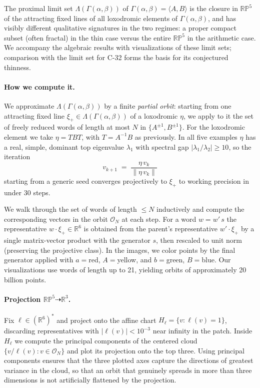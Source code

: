 \documentclass[11pt]{article}
\newcommand{\Gammaab}{\Gamma(\alpha,\beta)}
\begin{document}
The proximal limit set $\Lambda(\Gammaab)$ of $\Gammaab = \langle A, B \rangle$
is the closure in $\mathbb{RP}^5$ of the attracting fixed lines of all
loxodromic elements of $\Gammaab$, and has visibly different qualitative
signatures in the two regimes: a proper compact subset (often fractal) in
the thin case versus the entire $\mathbb{RP}^5$ in the arithmetic case.  We
accompany the algebraic results with visualizations of these limit sets;
comparison with the limit set for C-32 forms the basis for its conjectured
thinness.  






\paragraph{How we compute it.}

We approximate $\Lambda(\Gammaab)$ by a finite \emph{partial
orbit}: starting from one attracting fixed line $\xi_+ \in \Lambda(\Gammaab)$ of a loxodromic $\eta$, we
apply to it the set of freely reduced words of length at most $N$ in
$\{A^{\pm 1}, B^{\pm 1}\}$.  
For the loxodromic element we take $\eta = TBT$, with $T = A^{-1}B$ as previously.  In all five examples $\eta$ has a real, simple,
dominant top eigenvalue $\lambda_1$ with spectral gap $|\lambda_1/\lambda_2| \geq 10$,
so the iteration
\[
  v_{k+1} \;=\; \frac{\eta\, v_k}{\|\eta\, v_k\|}
\]
starting from a generic seed converges projectively to $\xi_+$ to working
precision in under $30$ steps.

We walk through the set of words of length $\leq N$ inductively and compute
the corresponding vectors in the orbit $\mathcal{O}_N$ at each step. For a word
$w = w'\, s$ the representative $w \cdot \xi_+ \in \mathbb{R}^6$ is
obtained from the parent's representative $w' \cdot \xi_+$ by a single
matrix-vector product with the generator $s$, then rescaled to unit norm
(preserving the projective class). 
In the images, we color points by the final generator applied with $a=$red, $A=$yellow, and $b=$green, $B=$blue.
Our visualizations use words of length up to 21, yielding orbits of approximately 20 billion points.  



\paragraph{Projection $\mathbb{RP}^5 \dashrightarrow \mathbb{R}^3$.}
Fix $\ell \in (\mathbb{R}^6)^*$ and project onto the affine chart
$H_\ell = \{v : \ell(v) = 1\}$, discarding representatives with
$|\ell(v)| < 10^{-3}$ near infinity in the patch.  Inside $H_\ell$ we compute the principal components
of the centered cloud $\{v/\ell(v) : v \in \mathcal{O}_N\}$ and plot its
projection onto the top three.  Using principal components ensures that the
three plotted axes capture the directions of greatest variance in the
cloud, so that an orbit that genuinely spreads in more than three
dimensions is not artificially flattened by the projection.
\end{document}
